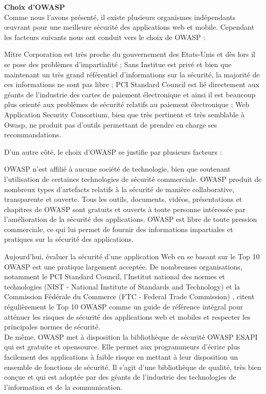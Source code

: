 \textbf{\RIGHTarrow Choix d'OWASP}\\
Comme nous l'avons présenté, il existe plusieurs organismes indépendants œuvrant pour une meilleure sécurité des applications web et mobile. Cependant les facteurs suivants nous ont conduit vers le choix de OWASP :
\begin{itemize}
	\itemtirait Mitre Corporation est très proche du gouvernement des Etats-Unis et dès lors il se pose des problèmes d'impartialité ;
	\itemtirait Sans Institue est privé et bien que maintenant un très grand référentiel d'informations sur la sécurité, la majorité de ces informations ne sont pas libre ;
	\itemtirait PCI Standard Council est lié directement aux géants de l'industrie des cartes de paiement électronique et ainsi il est beaucoup plus orienté aux problèmes de sécurité relatifs au paiement électronique ;
	\itemtirait Web Application Security Consortium, bien que très pertinent et très semblable à Owasp, ne produit pas d'outils permettant de prendre en charge ses recommandations.
\end{itemize}
D'un autre côté, le choix d'OWASP se justifie par plusieurs facteurs :
\begin{itemize}
	\itemcheck OWASP n'est affilié à aucune société de technologie, bien que soutenant l'utilisation de certaines technologies de sécurité commerciale. OWASP produit de nombreux types d'artefacts relatifs à la sécurité de manière collaborative, transparente et ouverte.
	\itemcheck Tous les outils, documents, vidéos, présentations et chapitres de OWASP sont gratuits et ouverts à toute personne intéressée par l'amélioration de la sécurité des applications.
	\itemcheck OWASP est libre de toute pression commerciale, ce qui lui permet de fournir des informations impartiales et pratiques sur la sécurité des applications.
\end{itemize}
\begin{comment}
	+ comparaison + tableau 
\end{comment}
Aujourd'hui, évaluer la sécurité d’une application Web en se basant sur le Top 10 OWASP est une pratique largement acceptée. De nombreuses organisations, notamment le PCI Standard Council, l'Institut national des normes et technologies (NIST - National Institute of Standards and Technology)  et la Commission Fédérale du Commerce (FTC - Federal Trade Commission) , citent régulièrement le Top 10 OWASP comme un guide de référence intégral pour atténuer les risques de sécurité des applications web et mobiles et respecter les principales normes de sécurité.\\
De même, OWASP met à disposition la bibliothèque de sécurité OWASP ESAPI qui est gratuite et opensource. Elle permet aux programmeurs d'écrire plus facilement des applications à faible risque en mettant à leur disposition un ensemble de fonctions de sécurité. Il s'agit d'une bibliothèque de qualité, très bien conçue et qui est adoptée par des géants de l'industrie des technologies de l'information et de la communication.